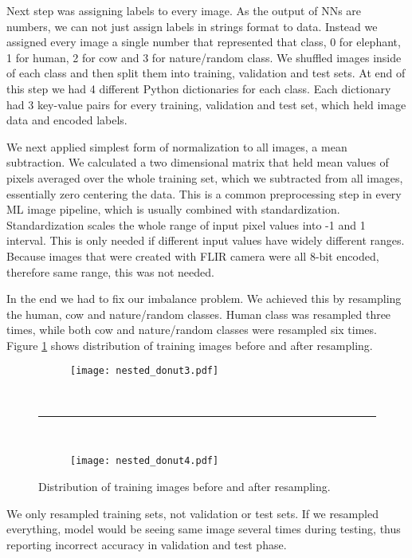 Next step was assigning labels to every image.
As the output of NNs are numbers, we can not just assign labels in strings format to data.
Instead we assigned every image a single number that represented that class, 0 for elephant, 1 for human, 2 for cow and 3 for nature/random class.
We shuffled images inside of each class and then split them into training, validation and test sets.
At end of this step we had 4 different Python dictionaries for each class.
Each dictionary had 3 key-value pairs for every training, validation and test set, which held image data and encoded labels.

We next applied simplest form of normalization to all images, a mean subtraction.
We calculated a two dimensional matrix that held mean values of pixels averaged over the whole training set, which we subtracted from all images, essentially zero centering the data.
This is a common preprocessing step in every ML image pipeline, which is usually combined with standardization\cite{cs231n}.
Standardization scales the whole range of input pixel values into -1 and 1 interval.
This is only needed if different input values have widely different ranges\cite{cs231n}.
Because images that were created with FLIR camera were all 8-bit encoded, therefore same range, this was not needed.

In the end we had to fix our imbalance problem.
We achieved this by resampling the human, cow and nature/random classes.
Human class was resampled three times, while both cow and nature/random classes were resampled six times.
Figure \ref{resampled} shows distribution of training images before and after resampling.

\begin{figure}[ht] 
    \begin{subfigure}[b]{1\textwidth}
        \centering
        \texttt{[image: nested\_donut3.pdf]} 
    \end{subfigure}
    \unskip\ \hrule\ 
    \begin{subfigure}[b]{1\textwidth}
        \centering
        \texttt{[image: nested\_donut4.pdf]} 
    \end{subfigure}
    
    \caption{ Distribution of training images before and after resampling.}
    \label{resampled}
\end{figure}

We only resampled training sets, not validation or test sets.
If we resampled everything, model would be seeing same image several times during testing, thus reporting incorrect accuracy in validation and test phase.

